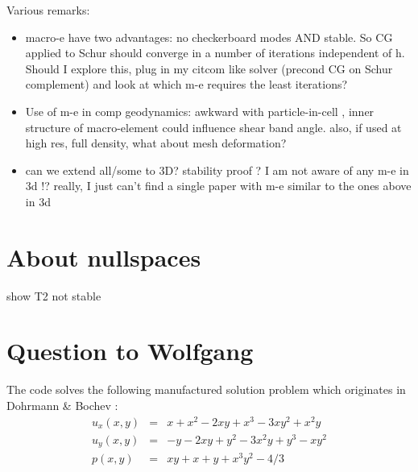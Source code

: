 \documentclass[a4paper,12pt]{article}
\begin{document}
Various remarks:
\begin{itemize}
\item
macro-e have two advantages: no checkerboard modes AND stable. 
So CG applied to Schur should converge in a number of iterations independent of h.
Should I explore this, plug in my citcom like solver (precond CG on Schur complement)
and look at which m-e requires the least iterations? 


\item 
Use of m-e in comp geodynamics: 
awkward with particle-in-cell , inner structure of macro-element could influence shear band angle. 
also, if used at high res, full density, what about mesh deformation?

\item can we extend all/some to 3D? stability proof ? I am not aware of any m-e in 3d !?
really, I just can't find a single paper with m-e similar to the ones above in 3d

\end{itemize}









\printbibliography

\appendix

\newpage
\section{About nullspaces}


show T2 not stable




\newpage
\section{Question to Wolfgang}

The code solves the following manufactured solution problem
which originates in Dohrmann \& Bochev \cite{dobo04}: 
\begin{eqnarray}
u_x(x,y) &=& x+x^2 - 2xy+x^3 - 3xy^2 + x^2y \\
u_y(x,y) &=& -y-2xy+y^2 -3x^2y + y^3 - xy^2 \\
p(x,y) &=& xy+x+y+x^3y^2 - 4/3
\end{eqnarray}
\end{document}
